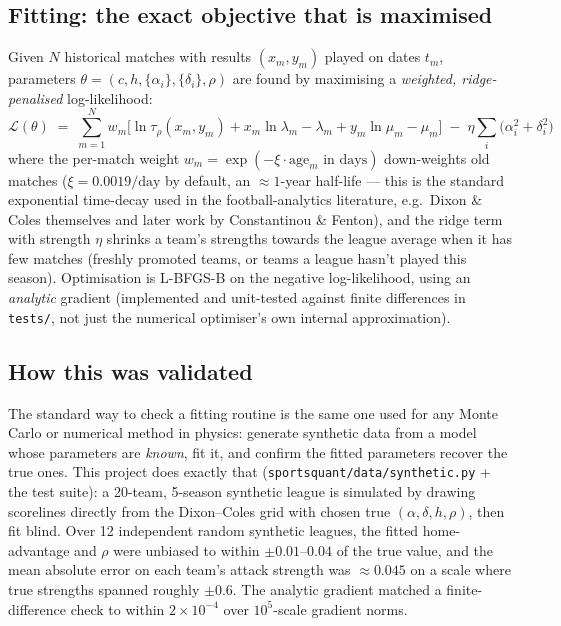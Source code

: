 \documentclass[11pt]{article}
\begin{document}
\subsection{Fitting: the exact objective that is maximised}
Given $N$ historical matches with results $(x_m,y_m)$ played on dates $t_m$, parameters $\theta =
(c,h,\{\alpha_i\},\{\delta_i\},\rho)$ are found by maximising a \emph{weighted, ridge-penalised}
log-likelihood:
\begin{equation}
\mathcal L(\theta) \;=\; \sum_{m=1}^{N} w_m\Big[\ln\tau_\rho(x_m,y_m) + x_m\ln\lambda_m-\lambda_m
+ y_m\ln\mu_m-\mu_m\Big] \;-\; \eta\sum_i\big(\alpha_i^2+\delta_i^2\big)
\end{equation}
where the per-match weight $w_m=\exp(-\xi\cdot\text{age}_m\text{ in days})$ down-weights old
matches ($\xi=0.0019/\text{day}$ by default, an $\approx\!1$-year half-life --- this is the
standard exponential time-decay used in the football-analytics literature, e.g.\ Dixon \& Coles
themselves and later work by Constantinou \& Fenton), and the ridge term with strength $\eta$
shrinks a team's strengths towards the league average when it has few matches (freshly promoted
teams, or teams a league hasn't played this season). Optimisation is L-BFGS-B on the negative
log-likelihood, using an \emph{analytic} gradient (implemented and unit-tested against finite
differences in \texttt{tests/}, not just the numerical optimiser's own internal approximation).

\subsection{How this was validated}
The standard way to check a fitting routine is the same one used for any Monte Carlo or numerical
method in physics: generate synthetic data from a model whose parameters are \emph{known}, fit it,
and confirm the fitted parameters recover the true ones. This project does exactly that
(\texttt{sportsquant/data/synthetic.py} + the test suite): a 20-team, 5-season synthetic league is
simulated by drawing scorelines directly from the Dixon--Coles grid with chosen true
$(\alpha,\delta,h,\rho)$, then fit blind. Over 12 independent random synthetic leagues, the fitted
home-advantage and $\rho$ were unbiased to within $\pm0.01$--$0.04$ of the true value, and the
mean absolute error on each team's attack strength was $\approx\!0.045$ on a scale where true
strengths spanned roughly $\pm0.6$. The analytic gradient matched a finite-difference check to
within $2\times10^{-4}$ over $10^{5}$-scale gradient norms.
\end{document}
